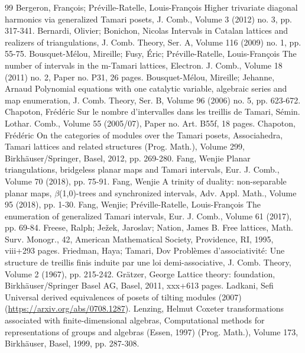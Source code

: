 \begin{thebibliography}{99}
 Bergeron, François; Préville-Ratelle, Louis-François Higher trivariate diagonal harmonics via generalized Tamari posets, J. Comb., Volume 3 (2012) no. 3, pp. 317-341.
 Bernardi, Olivier; Bonichon, Nicolas Intervals in Catalan lattices and realizers of triangulations, J. Comb. Theory, Ser. A, Volume 116 (2009) no. 1, pp. 55-75.
 Bousquet-Mélou, Mireille; Fusy, Éric; Préville-Ratelle, Louis-François The number of intervals in the m-Tamari lattices, Electron. J. Comb., Volume 18 (2011) no. 2, Paper no. P31, 26 pages.
 Bousquet-Mélou, Mireille; Jehanne, Arnaud Polynomial equations with one catalytic variable, algebraic series and map enumeration, J. Comb. Theory, Ser. B, Volume 96 (2006) no. 5, pp. 623-672.
 Chapoton, Frédéric Sur le nombre d’intervalles dans les treillis de Tamari, Sémin. Lothar. Comb., Volume 55 (2005/07), Paper no. Art. B55f, 18 pages.
 Chapoton, Frédéric On the categories of modules over the Tamari posets, Associahedra, Tamari lattices and related structures (Prog. Math.), Volume 299, Birkhäuser/Springer, Basel, 2012, pp. 269-280.
 Fang, Wenjie Planar triangulations, bridgeless planar maps and Tamari intervals, Eur. J. Comb., Volume 70 (2018), pp. 75-91.
 Fang, Wenjie A trinity of duality: non-separable planar maps, \(\beta\)(1,0)-trees and synchronized intervals, Adv. Appl. Math., Volume 95 (2018), pp. 1-30.
 Fang, Wenjie; Préville-Ratelle, Louis-François The enumeration of generalized Tamari intervals, Eur. J. Comb., Volume 61 (2017), pp. 69-84.
 Freese, Ralph; Ježek, Jaroslav; Nation, James B. Free lattices, Math. Surv. Monogr., 42, American Mathematical Society, Providence, RI, 1995, viii+293 pages.
 Friedman, Haya; Tamari, Dov Problèmes d’associativité: Une structure de treillis finis induite par une loi demi-associative, J. Comb. Theory, Volume 2 (1967), pp. 215-242.
 Grätzer, George Lattice theory: foundation, Birkhäuser/Springer Basel AG, Basel, 2011, xxx+613 pages.
 Ladkani, Sefi Universal derived equivalences of posets of tilting modules (2007) (\url{https://arxiv.org/abs/0708.1287}).
 Lenzing, Helmut Coxeter transformations associated with finite-dimensional algebras, Computational methods for representations of groups and algebras (Essen, 1997) (Prog. Math.), Volume 173, Birkhäuser, Basel, 1999, pp. 287-308.

\end{thebibliography}
